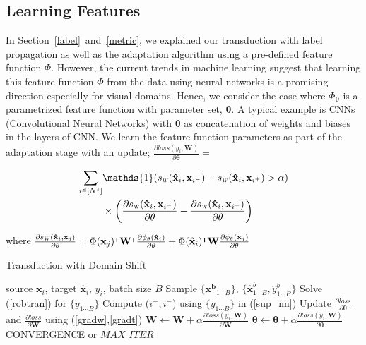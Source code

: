 \subsection{Learning Features}
In Section~\ref{label}~and~\ref{metric}, we explained our transduction with label propagation as well as the adaptation algorithm using a pre-defined feature function $\Phi$. However, the current trends in machine learning suggest that learning this feature function $\Phi$ from the data using neural networks is a promising direction especially for visual domains. Hence, we consider the case where $\Phi_{\mathbf{\theta}}$ is a parametrized feature function with parameter set, $\mathbf{\theta}$. A typical example is CNNs (Convolutional Neural Networks) with $\mathbf{\theta}$ as concatenation of weights and biases in the layers of CNN. We learn the feature function parameters as part of the adaptation stage with an update; $\frac{\partial loss (y_i, \mathbf{W})}{\partial \mathbf{\theta}} =$

\vspace{-3mm}
\begin{small}
\begin{equation}
\begin{aligned}
 \sum_{i \in [N^s]} &\mathds{1}(\sw(\xsi,\mathbf{x}_{i^-}) - \sw(\xsi,\mathbf{x}_{i^+})>\alpha)  \\
 &\times \left(\frac{\partial \sw(\xsi,\mathbf{x}_{i^-}) }{\partial \mathbf{\theta}} - \frac{\partial \sw(\xsi,\mathbf{x}_{i^+}) }{\partial \mathbf{\theta}} \right)
 \label{gradt}
 \end{aligned}
\end{equation}
\end{small}
where {\small $\frac{\partial \sw(\xsi,\xuj) }{\partial \mathbf{\theta}} =\Phi(\xuj)^\intercal \mathbf{W}^\intercal \frac{\partial \phi_\mathbf{\theta}(\xsi)}{\partial \theta} + \Phi(\xsi)^\intercal \mathbf{W} \frac{\partial \phi_\mathbf{\theta}(\xuj)}{\partial \theta} $}
\vspace{-3mm}

\begin{algorithm}[tb]
   \caption{Transduction with Domain Shift}
   \label{alg:example}
\begin{algorithmic}
    source $\mathbf{x}_i$, target $\mathbf{\hat{x}}_i$, $y_i$, batch size $B$
   \REPEAT
   \STATE  Sample $\{\mathbf{x^b}_{1 \cdots B}\}$, $\{\mathbf{\hat{x}}^b_{1 \cdots B}, \hat{y}^b_{1\cdots B}\}$
   \STATE Solve (\ref{robtran}) for $\{y_{1 \cdots B}\}$
   \STATE Compute ($i^+, i^-$) using $\{y_{1 \cdots B}\}$ in (\ref{sup_nn})
   \STATE Update $\frac{\partial loss}{\partial \mathbf{\theta}}$ and  $\frac{\partial loss}{\partial \mathbf{W}} $ using (\ref{gradw},\ref{gradt})
   \ENDIF
   \ENDFOR
   \STATE $\mathbf{W} \leftarrow \mathbf{W} + \alpha \frac{\partial loss (y_i, \mathbf{W})}{\partial \mathbf{W}}$ 
   \STATE $\mathbf{\theta} \leftarrow \mathbf{\theta} + \alpha \frac{\partial loss (y_i, \mathbf{W})}{\partial \mathbf{\theta}}$
   \UNTIL CONVERGENCE or $MAX\_ITER$
\end{algorithmic}
\end{algorithm}
